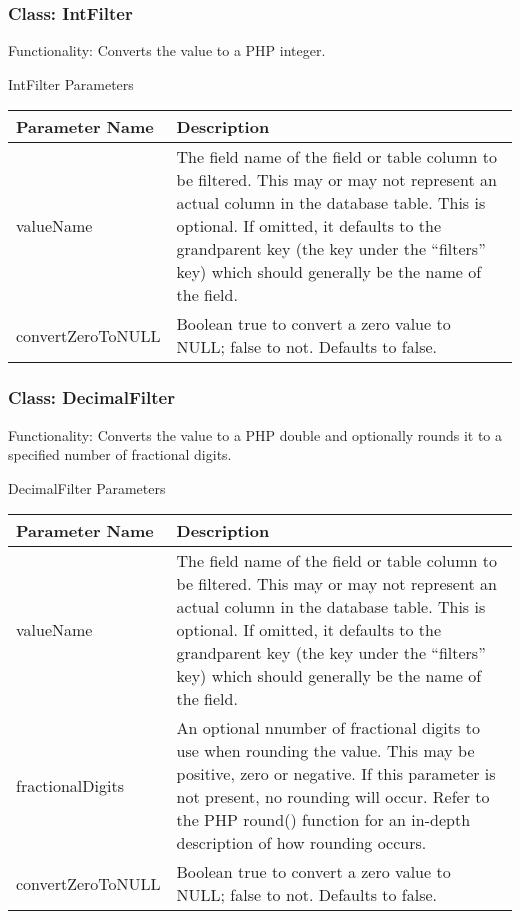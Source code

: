 \documentclass[letterpaper,10pt,english]{sphinxmanual}
\begin{document}
\subsubsection{Class: IntFilter}
\label{jaxFrameworkGuide:class-intfilter}
Functionality: Converts the value to a PHP integer.

IntFilter Parameters

\begin{tabulary}{\linewidth}{|L|L|}
\hline
\textbf{
Parameter Name
} & \textbf{
Description
}\\\hline

valueName
 & 
The field name of the field or table column to be filtered.  This may or may not
represent an actual column in the database table.  This is optional.  If omitted,
it defaults to the grandparent key (the key under the ``filters'' key) which should
generally be the name of the field.
\\\hline

convertZeroToNULL
 & 
Boolean true to convert a zero value to NULL; false to not.  Defaults to false.
\\\hline
\end{tabulary}



\subsubsection{Class: DecimalFilter}
\label{jaxFrameworkGuide:class-decimalfilter}
Functionality: Converts the value to a PHP double and optionally rounds it to a specified number of
fractional digits.

DecimalFilter Parameters

\begin{tabulary}{\linewidth}{|L|L|}
\hline
\textbf{
Parameter Name
} & \textbf{
Description
}\\\hline

valueName
 & 
The field name of the field or table column to be filtered.  This may or may not
represent an actual column in the database table.  This is optional.  If omitted,
it defaults to the grandparent key (the key under the ``filters'' key) which should
generally be the name of the field.
\\\hline

fractionalDigits
 & 
An optional nnumber of fractional digits to use when rounding the value.  This may
be positive, zero or negative.  If this parameter is not present, no rounding will
occur.  Refer to the PHP round() function for an in-depth description of how
rounding occurs.
\\\hline

convertZeroToNULL
 & 
Boolean true to convert a zero value to NULL; false to not.  Defaults to false.
\\\hline
\end{tabulary}
\end{document}
